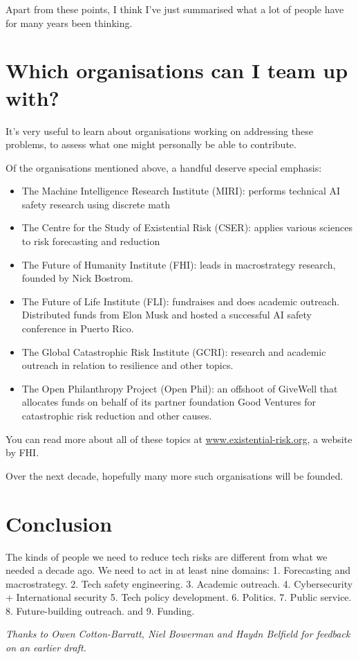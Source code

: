 ﻿\documentclass[12pt]{article}
\begin{document}
Apart from these points, I think I've just summarised what a lot of people have for many years been thinking.
\section{Which organisations can I team up with?}
It's very useful to learn about organisations working on addressing these problems, to assess what one might personally be able to contribute.

Of the organisations mentioned above, a handful deserve special emphasis:
\begin{itemize}
    \item The Machine Intelligence Research Institute (MIRI): performs technical AI safety research using discrete math
    \item The Centre for the Study of Existential Risk (CSER): applies various sciences to risk forecasting and reduction
    \item The Future of Humanity Institute (FHI): leads in macrostrategy research, founded by Nick Bostrom.
    \item The Future of Life Institute (FLI): fundraises and does academic outreach. Distributed funds from Elon Musk and hosted a successful AI safety conference in Puerto Rico.
    \item The Global Catastrophic Risk Institute (GCRI): research and academic outreach in relation to resilience and other topics.
    \item The Open Philanthropy Project (Open Phil): an offshoot of GiveWell that allocates funds on behalf of its partner foundation Good Ventures for catastrophic risk reduction and other causes.
\end{itemize}

You can read more about all of these topics at \href{www.existential-risk.org}{www.existential-risk.org}, a website by FHI.

Over the next decade, hopefully many more such organisations will be founded.

\section{Conclusion}
The kinds of people we need to reduce tech risks are different from what we needed a decade ago. We need to act in at least nine domains: 1. Forecasting and macrostrategy. 2. Tech safety engineering. 3. Academic outreach. 4. Cybersecurity + International security 5. Tech policy development. 6. Politics. 7. Public service. 8. Future-building outreach. and 9. Funding.

\vspace{3em}

{\itshape Thanks to Owen Cotton-Barratt, Niel Bowerman and Haydn Belfield for feedback on an earlier draft.}
\end{document}
